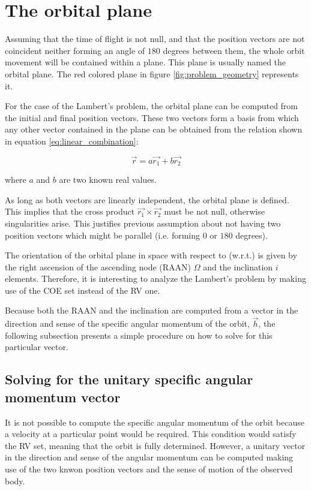 \section{The orbital plane}

Assuming that the time of flight is not null, and that the position vectors are
not coincident neither forming an angle of $180$ degrees between them, the whole
orbit movement will be contained within a plane. This plane is usually named the
orbital plane. The red colored plane in figure
\ref{fig:problem_geometry} represents it.

For the case of the Lambert's problem, the orbital plane can be computed
from the initial and final position vectors. These two vectors form a basis from
which any other vector contained in the plane can be obtained from the relation
shown in equation \ref{eq:linear_combination}:

\begin{equation}
  \vec{r} = a \vec{r_{1}} + b \vec{r_{2}}
  \label{eq:linear_combination}
\end{equation}

where $a$ and $b$ are two known real values.

As long as both vectors are linearly independent, the orbital plane is defined.
This implies that the cross product $\vec{r_{1}} \times \vec{r_{2}}$ must be not
null, otherwise singularities arise. This justifies previous assumption about
not having two position vectors which might be parallel (i.e. forming $0$ or
$180$ degrees).

The orientation of the orbital plane in space with respect to (w.r.t.) is
given by the right ascension of the ascending node (RAAN) $\Omega$ and the
inclination $i$ elements. Therefore, it is interesting to analyze the Lambert's
problem by making use of the COE set instead of the RV one.

Because both the RAAN and the inclination are computed from a vector in the
direction and sense of the specific angular momentum of the orbit, $\vec{h}$,
the following subsection presents a simple procedure on how to solve for this
particular vector.


\subsection{Solving for the unitary specific angular momentum vector}

It is not possible to compute the specific angular momentum of the orbit because
a velocity at a particular point would be required. This condition would satisfy
the RV set, meaning that the orbit is fully determined. However, a unitary
vector in the direction and sense of the angular momentum can be computed making
use of the two knwon position vectors and the sense of motion of the observed
body.

